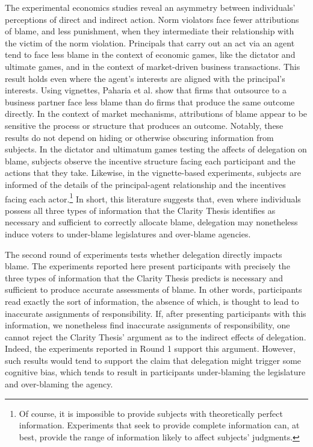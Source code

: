 \documentclass{article}
\begin{document}
The experimental economics studies reveal an asymmetry between individuals' perceptions of direct and indirect action. \citep{Coffman2011} Norm violators face fewer attributions of blame, and less punishment, when they intermediate their relationship with the victim of the norm violation. \citep{Paharia2009, Bartling2012} Principals that carry out an act via an agent tend to face less blame in the context of economic games, like the dictator and ultimate games,  \citep{Bartling2012} and in the context of market-driven business transactions.  \citep{Paharia2009} This result holds even where the agent's interests are aligned with the principal's interests. \citep{Gneezy2001} Using vignettes, Paharia et al. show that firms that outsource to a business partner face less blame than do firms that produce the same outcome directly. \citep{Paharia2009} In the context of market mechanisms, attributions of blame appear to be sensitive the process or structure that produces an outcome. \citep{Hayashi2013, Wiltermuth2011} Notably, these results do not depend on hiding or otherwise obscuring information from subjects. In the dictator and ultimatum games testing the affects of delegation on blame, subjects observe the incentive structure facing each participant and the actions that they take. Likewise, in the vignette-based experiments, subjects are informed of the details of the principal-agent relationship and the incentives facing each actor.\footnote{Of course, it is impossible to provide subjects with theoretically perfect information. Experiments that seek to provide complete information can, at best, provide the range of information likely to affect subjects' judgments.} In short, this literature suggests that, even where individuals possess all three types of information that the Clarity Thesis identifies as necessary and sufficient to correctly allocate blame, delegation may nonetheless induce voters to under-blame legislatures and over-blame agencies.

The second round of experiments tests whether delegation directly impacts blame. 
The experiments reported here present participants with precisely the three types of information that the Clarity Thesis predicts is necessary and sufficient to produce accurate assessments of blame. In other words, participants read exactly the sort of information, the absence of which, is thought to lead to inaccurate assignments of responsibility. If, after presenting participants with this information, we nonetheless find inaccurate assignments of responsibility, one cannot reject the Clarity Thesis' argument as to the indirect effects of delegation. Indeed, the experiments reported in Round 1 support this argument. However, such results would tend to support the claim that delegation might trigger some cognitive bias, which tends to result in participants under-blaming the legislature and over-blaming the agency. 
\end{document}
